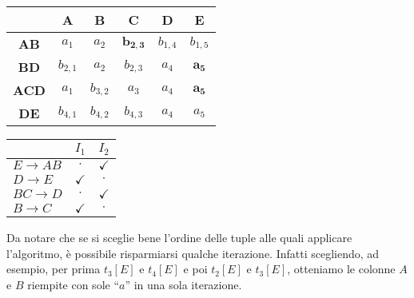  \begin{multicols}{2}
   \begin{center}
  \begin{tabular}{c|c|c|c|c|c}
    & \textbf{A} & \textbf{B} &\textbf{C} &\textbf{D}     &\textbf{E}\\
   \hline
   \textbf{AB} & $a_1$ & $a_2$ & $\mathbf{b_{2,3}}$ & $b_{1,4}$ & $b_{1,5}$ \\
   \hline
   \textbf{BD}  &$b_{2,1}$ & $a_2$  & $b_{2,3}$ & $a_4$ & $\mathbf{a_5}$ \\
   \hline
   \textbf{ACD} & $a_1$ & $b_{3,2}$  & $a_3$ & $a_4$ & $\mathbf{a_5}$\\
    \hline
   \textbf{DE} & $b_{4,1}$   & $b_{4,2}$  & $b_{4,3}$ & $a_4$ & $a_5$\\
  \end{tabular}
 \end{center}
 
  \begin{center}
  \begin{tabular}{l|c|c}
   & $I_1$ & $I_2$\\
   \hline
   $E\rightarrow AB$ & $\cdot$ & $\checkmark$ \\
   $D\rightarrow E$ & $\checkmark$ & $\cdot$ \\
   $BC\rightarrow D$ & $\cdot$ & $\checkmark$ \\
   $B\rightarrow C$ & $\checkmark$ & $\cdot$ \\
   \end{tabular}
 \end{center}
 \end{multicols}
 Da notare che se si sceglie bene l'ordine delle tuple alle quali applicare l'algoritmo, è possibile risparmiarsi qualche iterazione.
 Infatti scegliendo, ad esempio, per prima $t_3[E]$ e $t_4[E]$ e poi $t_2[E]$ e $t_3[E]$, otteniamo 
 le colonne $A$ e $B$ riempite con sole ``$a$'' in una sola iterazione. 
